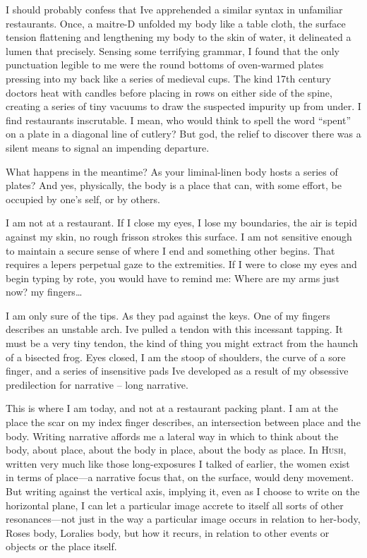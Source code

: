 \documentclass[
]{memoir}
\begin{document}
I should probably confess that Ive apprehended a similar syntax in
unfamiliar restaurants. Once, a maitre-D unfolded my body like a table
cloth, the surface tension flattening and lengthening my body to the
skin of water, it delineated a lumen that precisely. Sensing some
terrifying grammar, I found that the only punctuation legible to me were
the round bottoms of oven-warmed plates pressing into my back like a
series of medieval cups. The kind 17th century doctors heat with candles
before placing in rows on either side of the spine, creating a series of
tiny vacuums to draw the suspected impurity up from under. I find
restaurants inscrutable. I mean, who would think to spell the word
``spent'' on a plate in a diagonal line of cutlery? But god, the relief
to discover there was a silent means to signal an impending departure.

What happens in the meantime? As your liminal-linen body hosts a series
of plates? And yes, physically, the body is a place that can, with some
effort, be occupied by one's self, or by others.

I am not at a restaurant. If I close my eyes, I lose my boundaries, the
air is tepid against my skin, no rough frisson strokes this surface. I
am not sensitive enough to maintain a secure sense of where I end and
something other begins. That requires a lepers perpetual gaze to the
extremities. If I were to close my eyes and begin typing by rote, you
would have to remind me: Where are my arms just now? my fingers\ldots{}

I am only sure of the tips. As they pad against the keys. One of my
fingers describes an unstable arch. Ive pulled a tendon with this
incessant tapping. It must be a very tiny tendon, the kind of thing you
might extract from the haunch of a bisected frog. Eyes closed, I am the
stoop of shoulders, the curve of a sore finger, and a series of
insensitive pads Ive developed as a result of my obsessive predilection
for narrative -- long narrative.

This is where I am today, and not at a restaurant packing plant. I am at
the place the scar on my index finger describes, an intersection between
place and the body. Writing narrative affords me a lateral way in which
to think about the body, about place, about the body in place, about the
body as place. In \textsc{Hush}, written very much like those
long-exposures I talked of earlier, the women exist in terms of
place---a narrative focus that, on the surface, would deny movement. But
writing against the vertical axis, implying it, even as I choose to
write on the horizontal plane, I can let a particular image accrete to
itself all sorts of other resonances---not just in the way a particular
image occurs in relation to her-body, Roses body, Loralies body, but how
it recurs, in relation to other events or objects or the place itself.
\end{document}
